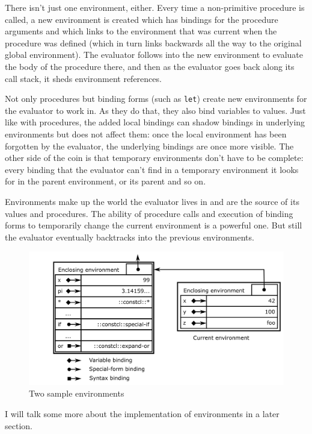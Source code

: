 \documentclass[twoside,9pt]{report}
\begin{document}
There isn't just one environment, either. Every time a non-primitive procedure is called, a new environment is created which has bindings for the procedure arguments and which links to the environment that was current when the procedure was defined (which in turn links backwards all the way to the original global environment). The evaluator follows into the new environment to evaluate the body of the procedure there, and then as the evaluator goes back along its call stack, it sheds environment references.


Not only procedures but binding forms (such as \texttt{let}) create new environments for the evaluator to work in. As they do that, they also bind variables to values. Just like with procedures, the added local bindings can shadow bindings in underlying environments but does not affect them: once the local environment has been forgotten by the evaluator, the underlying bindings are once more visible. The other side of the coin is that temporary environments don't have to be complete: every binding that the evaluator can't find in a temporary environment it looks for in the parent environment, or its parent and so on.


Environments make up the world the evaluator lives in and are the source of its values and procedures. The ability of procedure calls and execution of binding forms to temporarily change the current environment is a powerful one. But still the evaluator eventually backtracks into the previous environments.

\begin{figure}[h!]\includegraphics{images/environments.png}\captionsetup{labelformat=empty}\caption{ Two sample environments}\label{fig:-two-sample-environments}\end{figure}


I will talk some more about the implementation of environments in a later section.
\end{document}
